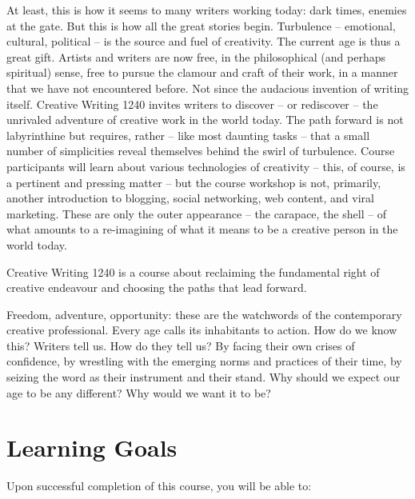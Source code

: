 \documentclass[letterpaper,10pt,headsepline]{scrreprt}
\begin{document}
At least, this is how it seems to many writers working today: dark times, enemies at the gate.
But this is how all the great stories begin. Turbulence -- emotional, cultural, political -- is the source and fuel of creativity. The current age is thus a great gift. Artists and writers are now free, in the philosophical (and perhaps spiritual) sense, free to pursue the clamour and craft of their work, in a manner that we have not encountered before. Not since the audacious invention of writing itself.
Creative Writing 1240 invites writers to discover -- or rediscover -- the unrivaled adventure of creative work in the world today. The path forward is not labyrinthine but requires, rather -- like most daunting tasks -- that a small number of simplicities reveal themselves behind the swirl of turbulence. Course participants will learn about various technologies of creativity -- this, of course, is a pertinent and pressing matter -- but the course workshop is not, primarily, another introduction to blogging, social networking, web content, and viral marketing. These are only the outer appearance -- the carapace, the shell -- of what amounts to a re-imagining of what it means to be a creative person in the world today.

Creative Writing 1240 is a course about reclaiming the fundamental right of creative endeavour and choosing the paths that lead forward.

Freedom, adventure, opportunity: these are the watchwords of the contemporary creative professional. Every age calls its inhabitants to action. How do we know this? Writers tell us. How do they tell us? By facing their own crises of confidence, by wrestling with the emerging norms and practices of their time, by seizing the word as their instrument and their stand. Why should we expect our age to be any different? Why would we want it to be?

\section{Learning Goals}

Upon successful completion of this course, you will be able to:
\end{document}
